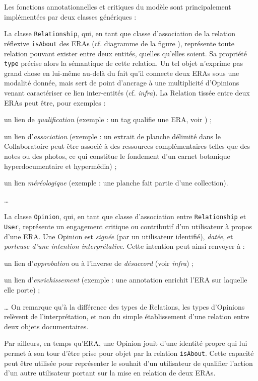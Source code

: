 Les fonctions annotationnelles et critiques du modèle sont principalement implémentées par deux classes génériques :

\startitemize
\item
La classe {\tt Relationship}, qui, en tant que classe d'association de la relation réflexive {\tt isAbout} des ERAs (cf. diagramme de la figure ), représente toute relation pouvant exister entre deux entités, quelles qu'elles soient.
Sa propriété {\tt type} précise alors la sémantique de cette relation.
Un tel objet n'exprime pas grand chose en lui-même au-delà du fait qu'il connecte deux ERAs sous une modalité donnée, mais sert de point d'ancrage à une multiplicité d'Opinions venant caractériser ce lien inter-entités (cf. {\it infra}).
La Relation tissée entre deux ERAs peut être, pour exemples :
		\startitemize
		\item un lien de {\em qualification} (exemple : un tag qualifie une ERA, voir ) ;
		\item un lien d'{\em association} (exemple : un extrait de planche délimité dans le Collaboratoire peut être associé à des ressources complémentaires telles que des notes ou des photos, ce qui constitue le fondement d'un carnet botanique hyperdocumentaire et hypermédia) ;
		\item un lien {\em méréologique} (exemple : une planche fait partie d'une collection).
		\item \dots{}
		\stopitemize
\item
La classe {\tt Opinion}, qui, en tant que classe d'association entre {\tt Relationship} et {\tt User}, représente un engagement critique ou contributif d'un utilisateur à propos d'une ERA.
Une Opinion est {\em signée} (par un utilisateur identifié), {\em datée}, et {\em porteuse d'une intention interprétative}.
Cette intention peut ainsi renvoyer à :
		\startitemize
		\item un lien d'{\em approbation} ou à l'inverse de {\em désaccord} (voir {\it infra}) ;
		\item un lien d'{\em enrichissement} (exemple : une annotation enrichit l'ERA sur laquelle elle porte) ;
		\item \dots{}
		\stopitemize
On remarque qu'à la différence des types de Relations, les types d'Opinions relèvent de l'interprétation, et non du simple établissement d'une relation entre deux objets documentaires.
\stopitemize

Par ailleurs, en temps qu'ERA, une Opinion jouit d'une identité propre qui lui permet à son tour d'être prise pour objet par la relation {\tt isAbout}.
Cette capacité peut être utilisée pour représenter le souhait d'un utilisateur de qualifier l'action d'un autre utilisateur portant sur la mise en relation de deux ERAs.

